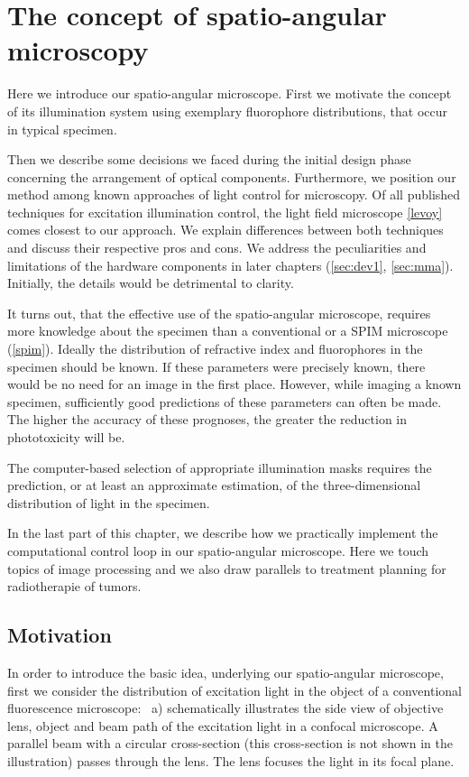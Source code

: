\chapter{The concept of spatio-angular microscopy}
\label{sec:concept}
\begin{summary}
  Here we introduce our spatio-angular microscope. First we motivate
  the concept of its illumination system using exemplary fluorophore
  distributions, that occur in typical specimen.

  Then we describe some decisions we faced during the initial design
  phase concerning the arrangement of optical components. Furthermore,
  we position our method among known approaches of light control for
  microscopy. Of all published techniques for excitation illumination
  control, the light field microscope \ref{levoy} comes closest to our
  approach.  We explain differences between both techniques and
  discuss their respective pros and cons.  We address the
  peculiarities and limitations of the hardware components in later
  chapters (\ref{sec:dev1}, \ref{sec:mma}).  Initially, the details
  would be detrimental to clarity.

  It turns out, that the effective use of the spatio-angular
  microscope, requires more knowledge about the specimen than a
  conventional or a SPIM microscope (\ref{spim}). Ideally the
  distribution of refractive index and fluorophores in the specimen
  should be known. If these parameters were precisely known, there
  would be no need for an image in the first place. However, while
  imaging a known specimen, sufficiently good predictions of these
  parameters can often be made. The higher the accuracy of these
  prognoses, the greater the reduction in phototoxicity will be.

  The computer-based selection of appropriate illumination masks
  requires the prediction, or at least an approximate estimation, of
  the three-dimensional distribution of light in the specimen.

  In the last part of this chapter, we describe how we practically
  implement the computational control loop in our spatio-angular
  microscope. Here we touch topics of image processing and we also
  draw parallels to treatment planning for radiotherapie of tumors.
\end{summary}
\section{Motivation}
In order to introduce the basic idea, underlying our spatio-angular
microscope, first we consider the distribution of excitation light in
the object of a conventional fluorescence microscope:
~a) schematically illustrates the side view
of objective lens, object and beam path of the excitation light in a
confocal microscope. A parallel beam with a circular cross-section
(this cross-section is not shown in the illustration) passes through
the lens. The lens focuses the light in its focal plane.


